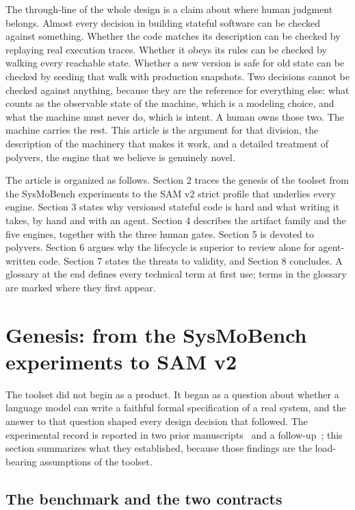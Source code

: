 \documentclass[11pt]{article}
\newcommand{\tool}[1]{\textsf{#1}}
\begin{document}
The through-line of the whole design is a claim about where human judgment
belongs. Almost every decision in building stateful software can be checked
against something. Whether the code matches its description can be checked by
replaying real execution traces. Whether it obeys its rules can be checked by
walking every reachable state. Whether a new version is safe for old state can
be checked by seeding that walk with production snapshots. Two decisions
cannot be checked against anything, because they are the reference for
everything else: what counts as the observable state of the machine, which is
a modeling choice, and what the machine must never do, which is intent. A
human owns those two. The machine carries the rest. This article is the
argument for that division, the description of the machinery that makes it
work, and a detailed treatment of \tool{polyvers}, the engine that we believe
is genuinely novel.

The article is organized as follows. Section 2 traces the genesis of the
toolset from the SysMoBench experiments to the SAM v2 strict profile that
underlies every engine. Section 3 states why versioned stateful code is hard
and what writing it takes, by hand and with an agent. Section 4 describes the
artifact family and the five engines, together with the three human gates.
Section 5 is devoted to \tool{polyvers}. Section 6 argues why the lifecycle is
superior to review alone for agent-written code. Section 7 states the threats
to validity, and Section 8 concludes. A glossary at the end defines every
technical term at first use; terms in the glossary are marked where they first
appear.

\section{Genesis: from the SysMoBench experiments to SAM v2}

The toolset did not begin as a product. It began as a question about whether a
language model can write a faithful formal specification of a real system, and
the answer to that question shaped every design decision that followed. The
experimental record is reported in two prior manuscripts~\cite{jsam1, jsam2}
and a follow-up~\cite{robust}; this section summarizes what they established,
because those findings are the load-bearing assumptions of the toolset.

\subsection{The benchmark and the two contracts}
\end{document}
